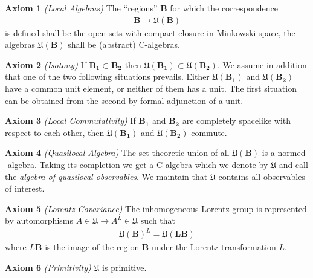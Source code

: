 \textbf{Axiom 1} \textit{(Local Algebras)} The ``regions'' $\mathbf{B}$ for which the correspondence
\begin{align}
\mathbf{B} \rightarrow \mathfrak{U}(\mathbf{B})
\end{align}
is defined shall be the open sets with compact closure in Minkowski space, the algebras $\mathfrak{U}(\mathbf{B})$ shall be (abstract) C\*-algebras.

\textbf{Axiom 2} \textit{(Isotony)} If $\mathbf{B_1} \subset \mathbf{B_2}$ then $\mathfrak{U}(\mathbf{B_1}) \subset \mathfrak{U}(\mathbf{B_2})$. We assume in addition that one of the two following situations prevails. Either $\mathfrak{U}(\mathbf{B_1})$ and $\mathfrak{U}(\mathbf{B_2})$ have a common unit element, or neither of them has a unit. The first situation can be obtained from the second by formal adjunction of a unit.

\textbf{Axiom 3} \textit{(Local Commutativity)} If $\mathbf{B_1}$ and $\mathbf{B_2}$ are completely spacelike with respect to each other, then $\mathfrak{U}(\mathbf{B_1})$ and $\mathfrak{U}(\mathbf{B_2})$ commute.

\textbf{Axiom 4} \textit{(Quasilocal Algebra)} The set-theoretic union of all $\mathfrak{U}(\mathbf{B})$ is a normed \*-algebra. Taking its completion we get a C\*-algebra which we denote by $\mathfrak{U}$ and call the \textit{algebra of quasilocal observables}. We maintain that $\mathfrak{U}$ contains all observables of interest.

\textbf{Axiom 5} \textit{(Lorentz Covariance)} The inhomogeneous Lorentz group is represented by automorphisms $A \in \mathfrak{U} \rightarrow A^L \in \mathfrak{U}$ such that
\begin{align}
\mathfrak{U}(\mathbf{B})^L = \mathfrak{U}(\mathbf{LB})
\end{align}
where $L\mathbf{B}$ is the image of the region $\mathbf{B}$ under the Lorentz transformation $L$.

\textbf{Axiom 6} \textit{(Primitivity)} $\mathfrak{U}$ is primitive.

